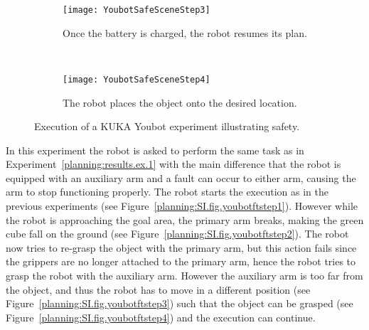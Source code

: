 {         \begin{figure}[t]
\centering
        \begin{subfigure}[b]{0.9\columnwidth}
                \centering
                \texttt{[image: YoubotSafeSceneStep3]}
                \caption{Once the battery is charged, the robot resumes its plan. }
                 \label{planning:SI.fig.youbotsafestep3}  
        \end{subfigure}   
        ~            
        \begin{subfigure}[b]{0.9\columnwidth}
                \centering
                \texttt{[image: YoubotSafeSceneStep4]}
                \caption{The robot places the object onto the desired location.}
                 \label{planning:SI.fig.youbotsafestep4}  
        \end{subfigure} 
        \caption{Execution of a KUKA Youbot  experiment illustrating safety.}
        \label{planning:SI.fig.yousafescreen2}
\end{figure}

\vspace*{\fill}

\clearpage

\begin{experiment}
In this experiment the robot is asked to perform the same task as in Experiment~\ref{planning:results.ex.1} with the main difference that the robot is equipped with an auxiliary arm and a fault can occur to either arm, causing the arm to stop functioning properly. The robot starts the execution as in the previous experiments (see Figure~\ref{planning:SI.fig.youbotftstep1}). However while the robot is approaching the goal area, the primary arm breaks, making the green cube fall on the ground (see Figure~\ref{planning:SI.fig.youbotftstep2}). The robot now tries to re-grasp the object with the primary arm, but this action fails since the grippers are no longer attached to the primary arm, hence the robot tries to grasp the robot with the auxiliary arm. However the auxiliary arm is too far from the object, and thus the robot has to move in a different position (see Figure~\ref{planning:SI.fig.youbotftstep3}) such that the object can  be grasped (see Figure~\ref{planning:SI.fig.youbotftstep4}) and the execution can continue.


\end{experiment}}
